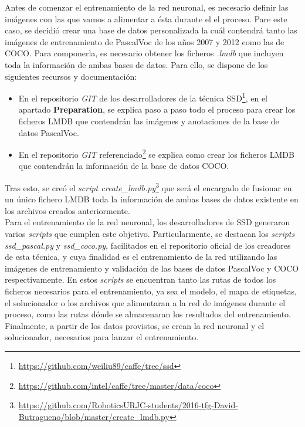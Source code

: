 \documentclass[a4paper, 12pt, oneside]{book}
\begin{document}
Antes de comenzar el entrenamiento de la red neuronal, es necesario definir las imágenes con las que vamos a alimentar a ésta durante el el proceso. Pare este caso, se decidió crear una base de datos personalizada la cuál contendrá tanto las imágenes de entrenamiento de PascalVoc de los años 2007 y 2012 como las de COCO. Para componerla, es necesario obtener los ficheros \textit{.lmdb} que incluyen toda la información de ambas bases de datos. Para ello, se dispone de los siguientes recursos y documentación:

\begin{itemize}
\item En el repositorio \textit{GIT} de los desarrolladores de la técnica SSD\footnote{\url{https://github.com/weiliu89/caffe/tree/ssd}}, en el apartado \textbf{Preparation}, se explica paso a paso todo el proceso para crear los ficheros LMDB que contendrán las imágenes y anotaciones de la base de datos PascalVoc.
\item En el repositorio \textit{GIT} referenciado\footnote{\url{https://github.com/intel/caffe/tree/master/data/coco}} se explica como crear los ficheros LMDB que contendrán la información de la base de datos COCO.
\end{itemize}

Tras esto, se creó el \textit{script create_lmdb.py}\footnote{\url{https://github.com/RoboticsURJC-students/2016-tfg-David-Butragueno/blob/master/create_lmdb.py}} que será el encargado de fusionar en un único fichero LMDB toda la información de ambas bases de datos existente en los archivos creados anteriormente.\\

Para el entrenamiento de la red neuronal, los desarrolladores de SSD generaron varios \textit{scripts} que cumplen este objetivo. Particularmente, se destacan los \textit{scripts} \textit{ssd\_pascal.py} y \textit{ssd\_coco.py}, facilitados en el repositorio oficial de los creadores de esta técnica, y cuya finalidad es el entrenamiento de la red utilizando las imágenes de entrenamiento y validación de las bases de datos PascalVoc y COCO respectivamente. En estos \textit{scripts} se encuentran tanto las rutas de todos los ficheros necesarios para el entrenamiento, ya sea el modelo, el mapa de etiquetas, el solucionador o los archivos que alimentaran a la red de imágenes durante el proceso, como las rutas dónde se almacenaran los resultados del entrenamiento. Finalmente, a partir de los datos provistos, se crean la red neuronal y el solucionador, necesarios para lanzar el entrenamiento.\\
\end{document}
